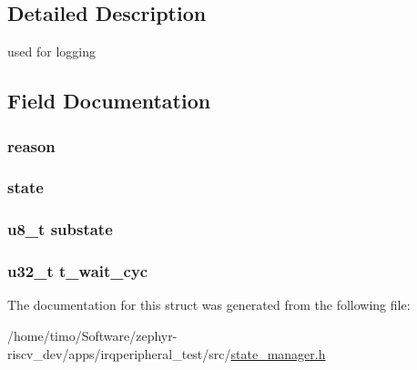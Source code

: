 \subsection{Detailed Description}
used for logging 

\subsection{Field Documentation}
\subsubsection[{\texorpdfstring{reason}{reason}}]{ reason}\hypertarget{struct_wait___event_a734736de72a0e0b0c1d7cdb3aeb38b67}{}\label{struct_wait___event_a734736de72a0e0b0c1d7cdb3aeb38b67}
\subsubsection[{\texorpdfstring{state}{state}}]{ state}\hypertarget{struct_wait___event_a6ed5d93e163f36fafba6a6fa602ab3f0}{}\label{struct_wait___event_a6ed5d93e163f36fafba6a6fa602ab3f0}
\subsubsection[{\texorpdfstring{substate}{substate}}]{\setlength{\rightskip}{0pt plus 5cm}u8\+\_\+t substate}\hypertarget{struct_wait___event_aa719d2e676dc0eeaafeaae9bbc1849f0}{}\label{struct_wait___event_aa719d2e676dc0eeaafeaae9bbc1849f0}
\subsubsection[{\texorpdfstring{t\+\_\+wait\+\_\+cyc}{t_wait_cyc}}]{\setlength{\rightskip}{0pt plus 5cm}u32\+\_\+t t\+\_\+wait\+\_\+cyc}\hypertarget{struct_wait___event_ac0c05f560bacae9a4ff37c4b734c9dae}{}\label{struct_wait___event_ac0c05f560bacae9a4ff37c4b734c9dae}


The documentation for this struct was generated from the following file\+:\begin{DoxyCompactItemize}
\item 
/home/timo/\+Software/zephyr-\/riscv\+\_\+dev/apps/irqperipheral\+\_\+test/src/\hyperlink{state__manager_8h}{state\+\_\+manager.\+h}\end{DoxyCompactItemize}
